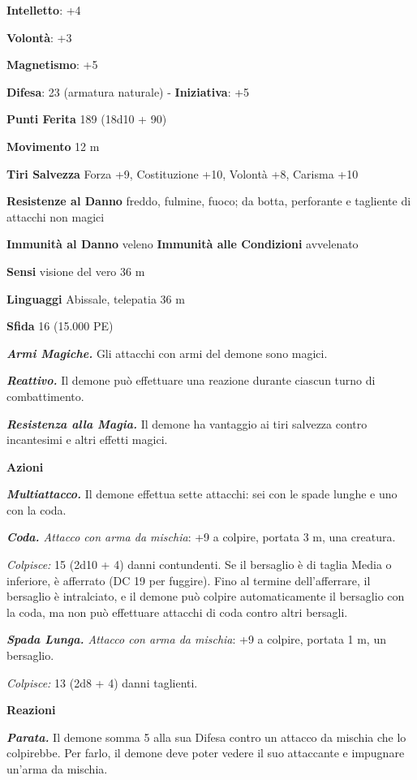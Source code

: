 \begin{multicols}{2}
\textbf{Intelletto}: +4

\textbf{Volontà}: +3

\textbf{Magnetismo}: +5

\textbf{Difesa}: 23 (armatura naturale) - \textbf{Iniziativa}: +5

\textbf{Punti Ferita} 189 (18d10 + 90)

\textbf{Movimento} 12 m

\textbf{Tiri Salvezza} Forza +9, Costituzione +10, Volontà +8, Carisma
+10

\textbf{Resistenze al Danno} freddo, fulmine, fuoco; da botta,
perforante e tagliente di attacchi non magici

\textbf{Immunità al Danno} veleno \textbf{Immunità alle Condizioni}
avvelenato

\textbf{Sensi} visione del vero 36 m

\textbf{Linguaggi} Abissale, telepatia 36 m

\textbf{Sfida} 16 (15.000 PE)\smallskip

\emph{\textbf{Armi Magiche.}} Gli attacchi con armi del demone sono
magici.

\emph{\textbf{Reattivo.}} Il demone può effettuare una reazione durante
ciascun turno di combattimento.

\emph{\textbf{Resistenza alla Magia.}} Il demone ha vantaggio ai tiri
salvezza contro incantesimi e altri effetti magici.

\smallskip\textbf{Azioni}

\emph{\textbf{Multiattacco.}} Il demone effettua sette attacchi: sei con
le spade lunghe e uno con la coda.

\emph{\textbf{Coda.} Attacco con arma da mischia}: +9 a colpire, portata
3 m, una creatura.

\emph{Colpisce:} 15 (2d10 + 4) danni contundenti. Se il bersaglio è di
taglia Media o inferiore, è afferrato (DC 19 per fuggire). Fino al
termine dell'afferrare, il bersaglio è intralciato, e il demone può
colpire automaticamente il bersaglio con la coda, ma non può effettuare
attacchi di coda contro altri bersagli.

\emph{\textbf{Spada Lunga.} Attacco con arma da mischia}: +9 a colpire,
portata 1 m, un bersaglio.

\emph{Colpisce:} 13 (2d8 + 4) danni taglienti.

\textbf{Reazioni}

\emph{\textbf{Parata.}} Il demone somma 5 alla sua Difesa contro un attacco
da mischia che lo colpirebbe. Per farlo, il demone deve poter vedere il
suo attaccante e impugnare un'arma da mischia.


\end{multicols}
